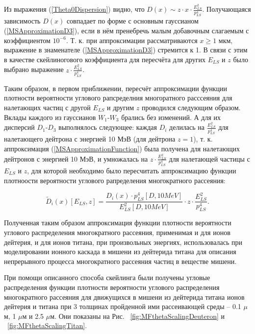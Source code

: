 \documentclass[a4paper,12pt]{article}
\begin{document}
\begin{large}
  	Из выражения (\ref{Theta0Dispersion}) видно, что $D(x) \sim z \cdot x \cdot \frac{E^2_{LS}}{p^4_{LS}}$. Получающаяся зависимость $D(x)$ совпадает по форме с основным гауссианом (\ref{MSApproximationD3}), если в нём пренебречь малым добавочным слагаемым с коэффициентом $10^{-6}$.
  	Т. к. при аппроксимации рассматриваются $x \geq 1$ мкм, выражение в знаменателе (\ref{MSApproximationD3}) стремится к 1.
  	В связи с этим в качестве скейлиногового коэффициента для пересчёта для других $E_{LS}$ и $z$ было выбрано выражение $z \cdot \frac{E^2_{LS}}{p^4_{LS}}$.
  
  	Таким образом, в первом приближении, пересчёт аппроксимации функции плотности вероятности углового рапсределния многоратного расссеяния для налетающих частиц с другой $E_{LS}$ и другим $z$ проводился следующим образом.
  	Вклады каждого из гауссианов $W_1$-$W_3$ брались без изменений.
  	А для их дисперсий $D_1$-$D_3$ выполнялось следующее: каждая $D_i$ делилась на $\frac{E^2_{LS}}{p^4_{LS}}$ для налетающего дейтрона с энергией 10 МэВ (для дейтрона $z=1$), т. к. аппроксимация (\ref{MSApproximationFunction}) была получена для налетающих дейтронов с энергией 10 МэВ, и умножалась на $z \cdot \frac{E^2_{LS}}{p^4_{LS}}$ для налетающей частицы с $E_{LS}$ и $z$, для которой необходимо было пересчитать аппроксимацию функции плотноости вероятности углового рапределения многократного рассеяния:
  	
\begin{equation}
  \label{DispersionScaling}
   \tilde D_i(x)[E_{LS}, z]=\frac{D_i(x) \cdot p^{4}_{LS}[D, 10 MeV]}{E^{2}_{LS}[D, 10 MeV]} \cdot z \cdot \frac{E^{2}_{LS}}{p^{4}_{LS}}.
\end{equation}  

	Полученная таким образом аппроксимация функции плотности вероятности углового распределения многократного рассеяния, применимая и для ионов дейтерия, и для ионов титана, при произвольных энергиях, использовалась при моделировании ионного каскада в мишени из дейтерида титана для описания непрерывного процесса многократного рассеяния частиц в веществе мишени.

	При помощи описанного способа скейлинга были получены угловые распределения функции плотности вероятности углового распределения многократного рассеяния для движущихся в мишени из дейтерида титана ионов дейтерия и титана при 3 толщинах пройденной ими рассеивающей среды -- 0.1 $\mu$м, 1 $\mu$м и 2.5 $\mu$м.
	Они показаны на Рис. ~\ref{fig:MFthetaScalingDeuteron} и ~\ref{fig:MFthetaScalingTitan}.
	

\end{large}
\end{document}
